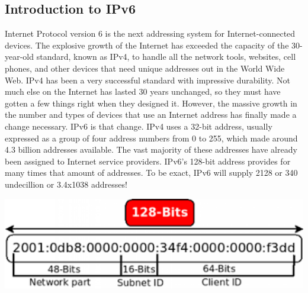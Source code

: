 \documentclass[17pt,a4paper,oneside,margin=1in]{article}
\begin{document}
\subsection{Introduction to IPv6}
Internet Protocol version 6 is the next addressing system for Internet-connected devices. The explosive growth of the Internet has exceeded the capacity of the 30-year-old standard, known as IPv4, to handle all the network tools, websites, cell phones, and other devices that need unique addresses out in the World Wide Web. IPv4 has been a very successful standard with impressive durability. Not much else on the Internet has lasted 30 years unchanged, so they must have gotten a few things right when they designed it. However, the massive growth in the number and types of devices that use an Internet address has finally made a change necessary. IPv6 is that change. IPv4 uses a 32-bit address, usually expressed as a group of four address numbers from 0 to 255, which made around 4.3 billion addresses available. The vast majority of these addresses have already been assigned to Internet service providers. IPv6’s 128-bit address provides for many times that amount of addresses. To be exact, IPv6 will supply 2128 or 340 undecillion or 3.4x1038 addresses!

\includegraphics[width=1\textwidth]{./scrot/ipv6.png}
\pagebreak
\end{document}
